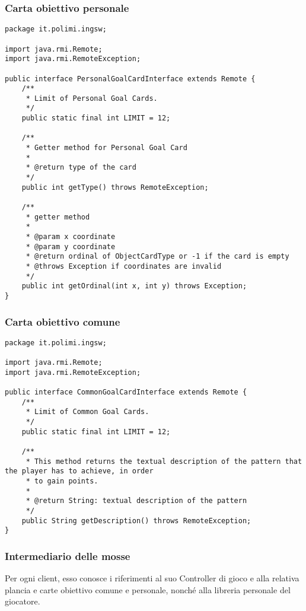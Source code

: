 \documentclass[a4paper,11pt]{article} %
\begin{document}
    \subsubsection{Carta obiettivo personale}
    \begin{verbatim}
package it.polimi.ingsw;

import java.rmi.Remote;
import java.rmi.RemoteException;

public interface PersonalGoalCardInterface extends Remote {
    /**
     * Limit of Personal Goal Cards.
     */
    public static final int LIMIT = 12;

    /**
     * Getter method for Personal Goal Card
     *
     * @return type of the card
     */
    public int getType() throws RemoteException;

    /**
     * getter method
     *
     * @param x coordinate
     * @param y coordinate
     * @return ordinal of ObjectCardType or -1 if the card is empty
     * @throws Exception if coordinates are invalid
     */
    public int getOrdinal(int x, int y) throws Exception;
}
    \end{verbatim}

    \newpage

    \subsubsection{Carta obiettivo comune}

    \begin{verbatim}
package it.polimi.ingsw;

import java.rmi.Remote;
import java.rmi.RemoteException;

public interface CommonGoalCardInterface extends Remote {
    /**
     * Limit of Common Goal Cards.
     */
    public static final int LIMIT = 12;

    /**
     * This method returns the textual description of the pattern that the player has to achieve, in order
     * to gain points.
     *
     * @return String: textual description of the pattern
     */
    public String getDescription() throws RemoteException;
}
    \end{verbatim}

    \newpage

    \subsubsection{Intermediario delle mosse}
    Per ogni client, esso conosce i riferimenti al suo Controller di gioco e
    alla relativa plancia e carte obiettivo comune e personale, nonché alla libreria personale del giocatore.
\end{document}
